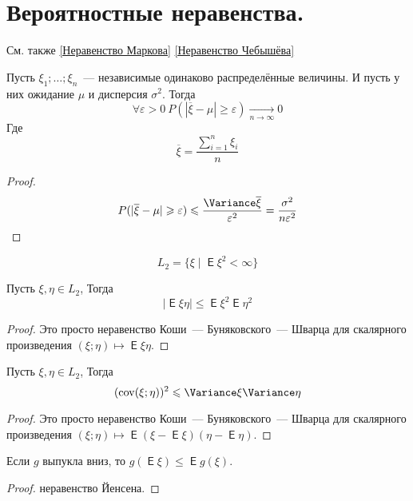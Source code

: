 \documentclass{article}
\DeclareMathOperator{\Expected}{\mathsf{E}}
\DeclareMathOperator{\Covariance}{cov}
\begin{document}
    \section{Вероятностные неравенства.}
    \begin{remark}
        См. также \ref{Неравенство Маркова} \ref{Неравенство Чебышёва}
    \end{remark}
    \begin{theorem}
        \label{Слабый закон больших чисел}
        Пусть $\xi_1;\ldots;\xi_n$~--- независимые одинаково распределённые величины. И пусть у них ожидание $\mu$ и дисперсия $\sigma^2$. Тогда
        $$
        \forall\varepsilon>0~P(|\overline\xi-\mu|\geqslant\varepsilon)\underset{n\to\infty}\longrightarrow0
        $$
        Где
        $$
        \overline\xi=\frac{\sum\limits_{i=1}^n\xi_i}n
        $$
    \end{theorem}
    \begin{proof}
        $$
        P(|\overline\xi-\mu|\geqslant\varepsilon)\leqslant\frac{\Variance\overline\xi}{\varepsilon^2}=\frac{\sigma^2}{n\varepsilon^2}
        $$
    \end{proof}
    \begin{definition}
        $$
        L_2=\{\xi\mid\Expected\xi^2<\infty\}
        $$
    \end{definition}
    \begin{claim}
        Пусть $\xi,\eta\in L_2$, Тогда
        $$
        |\Expected\xi\eta|\leqslant\Expected\xi^2\Expected\eta^2
        $$
    \end{claim}
    \begin{proof}
        Это просто неравенство Коши~--- Буняковского~--- Шварца для скалярного произведения $(\xi;\eta)\mapsto\Expected\xi\eta$.
    \end{proof}
    \begin{claim}
        Пусть $\xi,\eta\in L_2$, Тогда
        $$
        (\Covariance(\xi;\eta))^2\leqslant\Variance\xi\Variance\eta
        $$
    \end{claim}
    \begin{proof}
        Это просто неравенство Коши~--- Буняковского~--- Шварца для скалярного произведения $(\xi;\eta)\mapsto\Expected(\xi-\Expected\xi)(\eta-\Expected\eta)$.
    \end{proof}
    \begin{claim}
        Если $g$ выпукла вниз, то $g(\Expected\xi)\leqslant\Expected g(\xi)$.
    \end{claim}
    \begin{proof}
        неравенство Йенсена.
    \end{proof}
\end{document}
